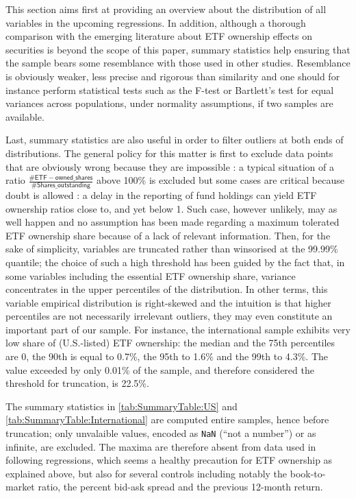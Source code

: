 This section aims first at providing an overview about the distribution of all variables in the upcoming regressions. In addition, although a thorough comparison with the emerging literature about ETF ownership effects on securities is beyond the scope of this paper, summary statistics help ensuring that the sample bears some resemblance with those used in other studies. Resemblance is obviously weaker, less precise and rigorous than similarity and one should for instance perform statistical tests such as the F-test or Bartlett's test for equal variances across populations, under normality assumptions, if two samples are available.

Last, summary statistics are also useful in order to filter outliers at both ends of distributions. The general policy for this matter is first to exclude data points that are obviously wrong because they are impossible : a typical situation of a ratio $\frac{\mathsf{\#ETF-owned\_shares}}{\mathsf{\#Shares\_outstanding}}$ above 100\% is excluded but some cases are critical because doubt is allowed : a delay in the reporting of fund holdings can yield ETF ownership ratios close to, and yet below 1. Such case, however unlikely, may as well happen and no assumption has been made regarding a maximum tolerated ETF ownership share because of a lack of relevant information. Then, for the sake of simplicity, variables are truncated rather than winsorised at the 99.99\% quantile; the choice of such a high threshold has been guided by the fact that, in some variables including the essential ETF ownership share, variance concentrates in the upper percentiles of the distribution. In other terms, this variable empirical distribution is right-skewed and the intuition is that higher percentiles are not necessarily irrelevant outliers, they may even constitute an important part of our sample. For instance, the international sample exhibits very low share of (U.S.-listed) ETF ownership: the median and the 75th percentiles are 0, the 90th is equal to 0.7\%, the 95th to 1.6\% and the 99th to 4.3\%. The value exceeded by only 0.01\% of the sample, and therefore considered the threshold for truncation, is 22.5\%. 

The summary statistics in \autoref{tab:SummaryTable:US} and \autoref{tab:SummaryTable:International} are computed entire samples, hence before truncation; only unvalaible values, encoded as \texttt{NaN} (``not a number'') or as infinite, are excluded. The maxima are therefore absent from data used in following regressions, which seems a healthy precaution for ETF ownership as explained above, but also for several controls including notably the book-to-market ratio, the percent bid-ask spread and the previous 12-month return.

